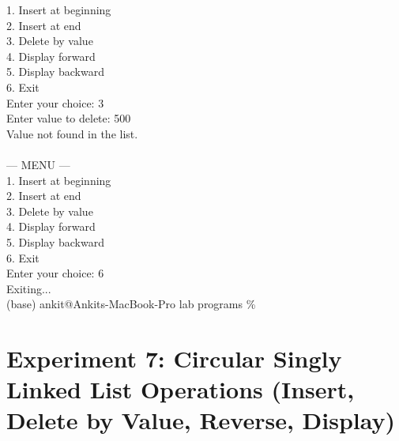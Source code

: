 \documentclass[12pt,a4paper]{article}
\begin{document}
\begin{tcolorbox}[terminalstyle, title=Sample Output]
{1. Insert at beginning\\
2. Insert at end\\
3. Delete by value\\
4. Display forward\\
5. Display backward\\
6. Exit\\
Enter your choice: 3\\
Enter value to delete: 500\\
Value not found in the list.\\
\\
--- MENU ---\\
1. Insert at beginning\\
2. Insert at end\\
3. Delete by value\\
4. Display forward\\
5. Display backward\\
6. Exit\\
Enter your choice: 6\\
Exiting...\\
(base) ankit@Ankits-MacBook-Pro lab programs \%
}
\end{tcolorbox}

\newpage
\section*{Experiment 7: Circular Singly Linked List Operations (Insert, Delete by Value, Reverse, Display)}
\end{document}
